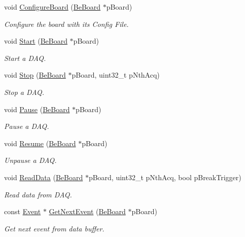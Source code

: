 \begin{DoxyCompactItemize}
void \hyperlink{class_ph2___hw_interface_1_1_be_board_interface_a808eabcbd850dd651f9b3122f702079f}{Configure\-Board} (\hyperlink{class_ph2___hw_description_1_1_be_board}{Be\-Board} $\ast$p\-Board)
\begin{DoxyCompactList}\small\item\em Configure the board with its Config File. \end{DoxyCompactList}\item 
void \hyperlink{class_ph2___hw_interface_1_1_be_board_interface_ac78a16fd4779f86c1224b09d30349e18}{Start} (\hyperlink{class_ph2___hw_description_1_1_be_board}{Be\-Board} $\ast$p\-Board)
\begin{DoxyCompactList}\small\item\em Start a D\-A\-Q. \end{DoxyCompactList}\item 
void \hyperlink{class_ph2___hw_interface_1_1_be_board_interface_a08d0374efe31d8078f8d31f58b709e6f}{Stop} (\hyperlink{class_ph2___hw_description_1_1_be_board}{Be\-Board} $\ast$p\-Board, uint32\-\_\-t p\-Nth\-Acq)
\begin{DoxyCompactList}\small\item\em Stop a D\-A\-Q. \end{DoxyCompactList}\item 
void \hyperlink{class_ph2___hw_interface_1_1_be_board_interface_a2b9692f018d7756fbfd720224da542da}{Pause} (\hyperlink{class_ph2___hw_description_1_1_be_board}{Be\-Board} $\ast$p\-Board)
\begin{DoxyCompactList}\small\item\em Pause a D\-A\-Q. \end{DoxyCompactList}\item 
void \hyperlink{class_ph2___hw_interface_1_1_be_board_interface_ad21d2651379571889a7a2ebc55ee3223}{Resume} (\hyperlink{class_ph2___hw_description_1_1_be_board}{Be\-Board} $\ast$p\-Board)
\begin{DoxyCompactList}\small\item\em Unpause a D\-A\-Q. \end{DoxyCompactList}\item 
void \hyperlink{class_ph2___hw_interface_1_1_be_board_interface_a3e5106285fa795c21cb9d20fbf753759}{Read\-Data} (\hyperlink{class_ph2___hw_description_1_1_be_board}{Be\-Board} $\ast$p\-Board, uint32\-\_\-t p\-Nth\-Acq, bool p\-Break\-Trigger)
\begin{DoxyCompactList}\small\item\em Read data from D\-A\-Q. \end{DoxyCompactList}\item 
const \hyperlink{class_ph2___hw_interface_1_1_event}{Event} $\ast$ \hyperlink{class_ph2___hw_interface_1_1_be_board_interface_a8dadf0d6aba310d1476b5c50aae98742}{Get\-Next\-Event} (\hyperlink{class_ph2___hw_description_1_1_be_board}{Be\-Board} $\ast$p\-Board)
\begin{DoxyCompactList}\small\item\em Get next event from data buffer. \end{DoxyCompactList}\end{DoxyCompactItemize}
